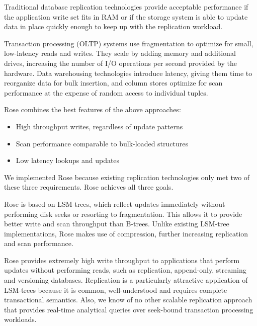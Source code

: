\documentclass{vldb}
\newcommand{\rows}{Rose\xspace}
\newcommand{\rowss}{Rose's\xspace}
\begin{document}
Traditional database replication technologies provide acceptable
performance if the application write set fits in RAM or if the
storage system is able to update data in place quickly enough to keep
up with the replication workload.

Transaction processing (OLTP)
systems use fragmentation to optimize for small, low-latency reads and writes. %
They scale by adding memory and additional drives, increasing the number of
I/O operations per second provided by the hardware.  Data warehousing technologies introduce
latency, giving them time to reorganize data for bulk insertion, and 
column stores optimize for scan performance at the expense of random
access to individual tuples.

\rows combines the best features of the above approaches:

\begin{itemize}
\item High throughput writes, regardless of update patterns
\item Scan performance comparable to bulk-loaded structures
\item Low latency lookups and updates
\end{itemize}
We implemented \rows because existing replication technologies
only met two of these three requirements.  \rows achieves all three
goals.

\rows is based on LSM-trees, which reflect updates immediately
without performing disk seeks or resorting to fragmentation.  This
allows it to provide better write and scan throughput than B-trees.
Unlike existing LSM-tree implementations, \rows makes use of
compression, further increasing replication and scan performance.

\rows provides extremely high write throughput to applications that
perform updates without performing reads, such as replication, append-only, streaming
and versioning databases.
Replication is a particularly attractive application of LSM-trees because
it is common, well-understood and requires complete transactional
semantics.  Also, we know of no other scalable replication approach
that provides real-time analytical queries over seek-bound transaction
processing workloads.
\end{document}
